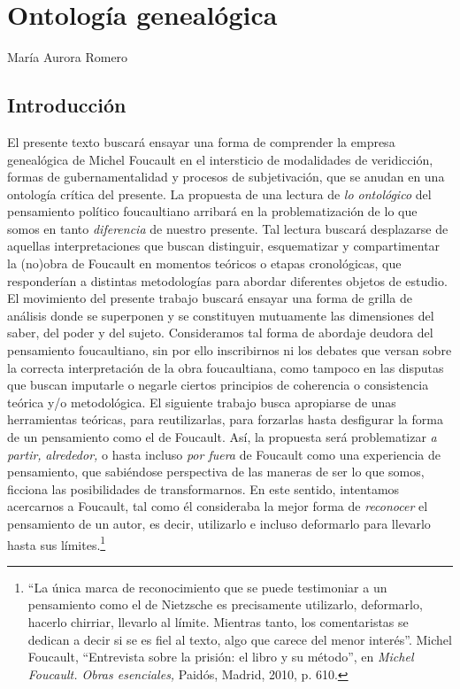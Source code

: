 \chapter{Ontología genealógica}

María Aurora Romero

\section{Introducción}

El presente texto buscará ensayar una forma de comprender la empresa genealógica de Michel Foucault en el intersticio de modalidades de veridicción, formas de gubernamentalidad y procesos de subjetivación, que se anudan en una ontología crítica del presente. La propuesta de una lectura de \emph{lo ontológico} del pensamiento político foucaultiano arribará en la problematización de lo que somos en tanto \emph{diferencia} de nuestro presente. Tal lectura buscará desplazarse de aquellas interpretaciones que buscan distinguir, esquematizar y compartimentar la (no)obra de Foucault en momentos teóricos o etapas cronológicas, que responderían a distintas metodologías para abordar diferentes objetos de estudio. El movimiento del presente trabajo buscará ensayar una forma de grilla de análisis donde se superponen y se constituyen mutuamente las dimensiones del saber, del poder y del sujeto. Consideramos tal forma de abordaje deudora del pensamiento foucaultiano, sin por ello inscribirnos ni los debates que versan sobre la correcta interpretación de la obra foucaultiana, como tampoco en las disputas que buscan imputarle o negarle ciertos principios de coherencia o consistencia teórica y/o metodológica. El siguiente trabajo busca apropiarse de unas herramientas teóricas, para reutilizarlas, para forzarlas hasta desfigurar la forma de un pensamiento como el de Foucault. Así, la propuesta será problematizar \emph{a partir,} \emph{alrededor,} o hasta incluso \emph{por fuera} de Foucault como una experiencia de pensamiento, que sabiéndose perspectiva de las maneras de ser lo que somos, ficciona las posibilidades de transformarnos. En este sentido, intentamos acercarnos a Foucault, tal como él consideraba la mejor forma de \emph{reconocer} el pensamiento de un autor, es decir, utilizarlo e incluso deformarlo para llevarlo hasta sus límites.\footnote{\enquote{La única marca de reconocimiento que se puede testimoniar a un pensamiento como el de Nietzsche es precisamente utilizarlo, deformarlo, hacerlo chirriar, llevarlo al límite. Mientras tanto, los comentaristas se dedican a decir si se es fiel al texto, algo que carece del menor interés}. Michel Foucault, \enquote{Entrevista sobre la prisión: el libro y su método}, en \emph{Michel Foucault. Obras esenciales,} Paidós, Madrid, 2010, p. 610.}

